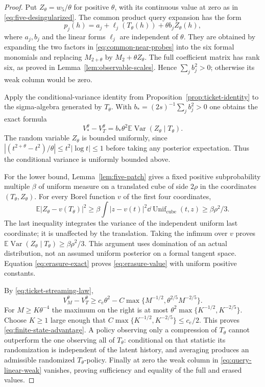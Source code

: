 \documentclass[11pt]{amsart}
\theoremstyle{definition}\newtheorem{definition}[theorem]{Definition}
\theoremstyle{remark}\newtheorem{remark}[theorem]{Remark}
\newcommand{\E}{\mathbb E}\newcommand{\Prob}{\mathbb P}
\DeclareMathOperator{\Var}{Var}\DeclareMathOperator{\Cov}{Cov}
\begin{document}
\begin{proof}
Put $Z_\theta=w_5/\theta$ for positive $\theta$, with its continuous
value at zero as in \eqref{eq:five-desingularized}. The common product
query expansion has the form
\begin{equation}\label{eq:query-linear-weak}
 p_j(h)=a_j+\ell_j(T_\theta(h))+\theta b_jZ_\theta(h),
\end{equation}
where $a_j,b_j$ and the linear forms $\ell_j$ are independent of
$\theta$. They are obtained by expanding the two factors in
\eqref{eq:common-near-probes} into the six formal monomials and replacing
$M_{2+\theta}$ by $M_2+\theta Z_\theta$. The full coefficient matrix
has rank six, as proved in Lemma~\ref{lem:observable-scales}. Hence
$\sum_jb_j^2>0$; otherwise its weak column would be zero.

Apply the conditional-variance identity from
Proposition~\ref{prop:ticket-identity} to the sigma-algebra generated by
$T_\theta$. With $b_*=(2s)^{-1}\sum_jb_j^2>0$ one obtains the exact
formula
\begin{equation}\label{eq:erasure-exact}
 V_*^\theta-V_T^\theta
       =b_*\theta^2\E\Var(Z_\theta\mid T_\theta).
\end{equation}
The random variable $Z_\theta$ is bounded uniformly, since
$|(t^{2+\theta}-t^2)/\theta|\le t^2|\log t|\le1$ before taking
any posterior expectation. Thus the conditional variance is uniformly
bounded above.

For the lower bound, Lemma~\ref{lem:five-patch} gives a fixed positive
subprobability multiple $\beta$ of uniform measure on a translated cube
of side $2\rho$ in the coordinates $(T_\theta,Z_\theta)$. For every
Borel function $v$ of the first four coordinates,
\[
 \E|Z_\theta-v(T_\theta)|^2
 \ge\beta\int|z-v(t)|^2\dd\operatorname{Unif}_{\text{cube}}(t,z)
 \ge\beta\rho^2/3.
\]
The last inequality integrates the variance of the independent uniform
last coordinate; it is unaffected by the translation. Taking the infimum
over $v$ proves
$\E\Var(Z_\theta\mid T_\theta)\ge\beta\rho^2/3$.
This argument uses domination of an actual distribution, not an assumed
uniform posterior on a formal tangent space. Equation
\eqref{eq:erasure-exact} proves \eqref{eq:erasure-value} with uniform
positive constants.

By \eqref{eq:ticket-streaming-law},
\[
 V_M^\theta-V_T^\theta
 \ge c_e\theta^2-C\max\{M^{-1/2},\theta^{2/5}M^{-2/5}\}.
\]
For $M\ge K\theta^{-4}$ the maximum on the right is at most
$\theta^2\max\{K^{-1/2},K^{-2/5}\}$. Choose $K\ge1$ large enough
that $C\max\{K^{-1/2},K^{-2/5}\}\le c_e/2$. This proves
\eqref{eq:finite-state-advantage}. A policy observing only a compression
of $T_\theta$ cannot outperform the one observing all of $T_\theta$:
conditional on that statistic its randomization is independent of the
latent history, and averaging produces an admissible randomized
$T_\theta$-policy. Finally at zero the weak column in
\eqref{eq:query-linear-weak} vanishes, proving sufficiency and equality
of the full and erased values.
\end{proof}
\end{document}
